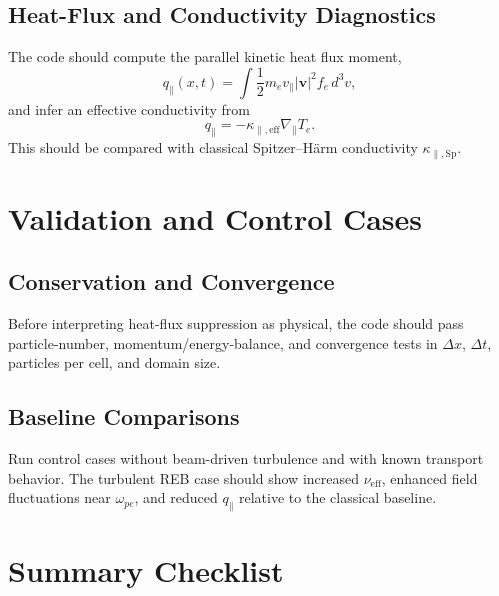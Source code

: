 \documentclass[11pt,a4paper]{article}
\begin{document}
\subsection{Heat-Flux and Conductivity Diagnostics}
The code should compute the parallel kinetic heat flux moment,
\begin{equation}
    q_\parallel(x,t)=\int \frac{1}{2}m_e v_\parallel |\mathbf{v}|^2 f_e\,d^3v,
\end{equation}
and infer an effective conductivity from
\begin{equation}
    q_\parallel = -\kappa_{\parallel,\mathrm{eff}}\nabla_\parallel T_e.
\end{equation}
This should be compared with classical Spitzer--H\"arm conductivity $\kappa_{\parallel,\mathrm{Sp}}$.

\section{Validation and Control Cases}

\subsection{Conservation and Convergence}
Before interpreting heat-flux suppression as physical, the code should pass particle-number, momentum/energy-balance, and convergence tests in $\Delta x$, $\Delta t$, particles per cell, and domain size.

\subsection{Baseline Comparisons}
Run control cases without beam-driven turbulence and with known transport behavior. The turbulent REB case should show increased $\nu_{\mathrm{eff}}$, enhanced field fluctuations near $\omega_{pe}$, and reduced $q_\parallel$ relative to the classical baseline.

\section{Summary Checklist}
\end{document}
